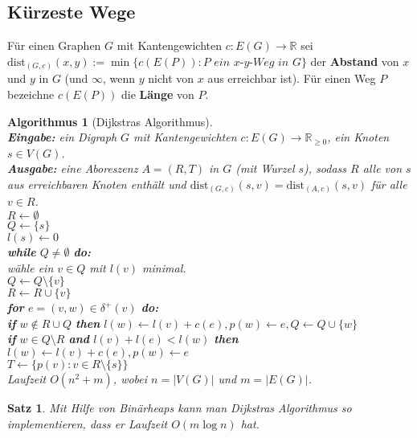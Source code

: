 \documentclass[12pt,a4paper]{article}
\theoremstyle{plain}
\newtheorem{Satz}[Theorem]{Satz}
\newtheorem{Algorithmus}[Theorem]{Algorithmus}
\newcommand{\R}{\mathbb{R}}
\numberwithin{equation}{section}
\begin{document}
\subsection{Kürzeste Wege}
Für einen Graphen $G$ mit Kantengewichten $c: E(G)\rightarrow \R$ sei $\text{dist}_{(G,c)}(x,y):=\min\{c(E(P)): \textit{P ein x-y-Weg in G}\}$ der \textbf{Abstand} von $x$ und $y$ in $G$ (und $\infty$, wenn $y$ nicht von $x$ aus erreichbar ist). Für einen Weg $P$ bezeichne $c(E(P))$ die \textbf{Länge} von $P$.
\begin{Algorithmus}[Dijkstras Algorithmus]\\
\textbf{Eingabe:} ein Digraph $G$ mit Kantengewichten $c: E(G)\rightarrow \R_{\geq 0}$, ein Knoten $s\in V(G)$.\\
\textbf{Ausgabe:} eine Aboreszenz $A=(R,T)$ in $G$ (mit Wurzel $s$), sodass $R$ alle von $s$ aus erreichbaren Knoten enthält und $\text{dist}_{(G,c)}(s,v)=\text{dist}_{(A,c)}(s,v)$ für alle $v \in R$.\\
$R\leftarrow \emptyset$\\
$Q\leftarrow \{s\}$\\
$l(s)\leftarrow 0$\\
\textbf{while} $Q\neq \emptyset$ \textbf{do:}\\
\text{\qquad} wähle ein $v\in Q$ mit $l(v)$ minimal.\\
\text{\qquad} $Q\leftarrow Q\setminus \{v\}$\\
\text{\qquad} $R\leftarrow R\cup \{v\}$\\
\text{\qquad} \textbf{for} $e=(v,w)\in \delta^+(v)$ \textbf{do:}\\
\text{\qquad \qquad} \textbf{if} $w\not\in R \cup Q$ \textbf{then} $l(w)\leftarrow l(v)+c(e), p(w)\leftarrow e, Q\leftarrow Q\cup \{w\}$\\
\text{\qquad \qquad} \textbf{if} $w\in Q\setminus R$ \textbf{and} $l(v)+l(e)<l(w)$ \textbf{then} $l(w)\leftarrow l(v)+c(e), p(w)\leftarrow e$\\
$T\leftarrow \{p(v): v\in R\setminus\{s\}\}$\\
Laufzeit $O(n^2+m)$, wobei $n=|V(G)|$ und $m=|E(G)|$.
\end{Algorithmus}
\begin{Satz}
Mit Hilfe von Binärheaps kann man Dijkstras Algorithmus so implementieren, dass er Laufzeit $O(m \log n)$ hat.
\end{Satz}
\end{document}
